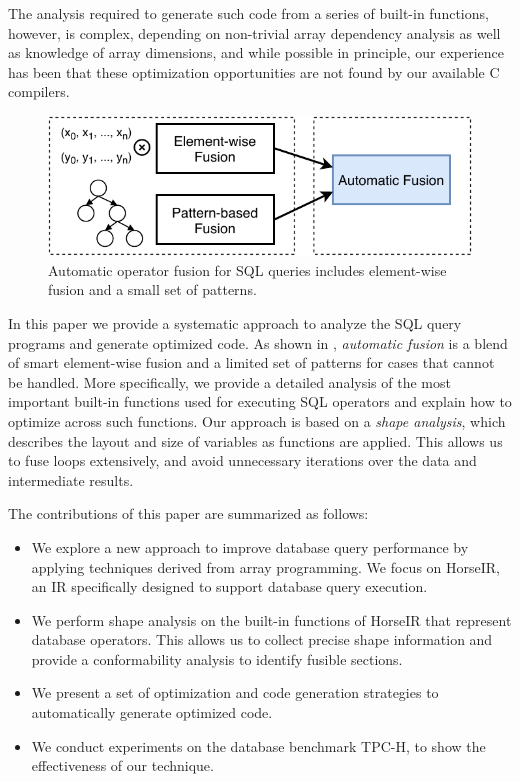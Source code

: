 \noindent{}The analysis required to generate such code from a series of built-in functions, however, is complex,
depending on non-trivial array dependency analysis as well as knowledge of array dimensions, and 
while possible in principle, our experience has been that these optimization opportunities are not found by our available C compilers.

\begin{figure}[htbp]
\centering
\includegraphics[width=.9\columnwidth]{./src/figure/basic-idea.pdf}
\caption{Automatic operator fusion for SQL queries includes element-wise fusion and a small set of patterns.}
\label{fig:fusion_idea}
\end{figure}

In this paper we provide a systematic approach to analyze the SQL query programs
and generate optimized code. As shown in ,
\textit{automatic fusion} is a blend of smart element-wise fusion and a limited set of
patterns for cases that cannot be handled. More specifically, we provide a detailed
analysis of the most important built-in functions used for executing SQL operators
and explain how to optimize across such functions. Our approach is based on a
\textit{shape analysis}, which describes the layout and size of variables as
functions are applied. This allows us to fuse loops extensively, and avoid unnecessary
iterations over the data and intermediate results.  

The contributions of this paper are summarized as follows:

\begin{itemize}
\item We explore a new approach to improve database query performance by
      applying techniques derived from array programming. We focus on HorseIR, an IR specifically designed to support database query execution.
\item We perform shape analysis on the built-in functions of HorseIR that represent database operators. This allows us to collect precise shape information and provide a conformability analysis to identify fusible sections. 
\item We present a set of optimization and code generation strategies to automatically
      generate optimized code.
\item We conduct experiments on the database benchmark TPC-H, to show the effectiveness of our technique.
\end{itemize}

